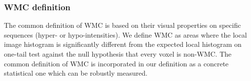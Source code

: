 \subsubsection{WMC definition}
The common definition of WMC is based on their visual properties on specific sequences (hyper- or hypo-intensities). We define WMC as areas where the local image histogram is significantly different from the expected local histogram on one-tail test against the null hypothesis that every voxel is non-WMC. The common definition of WMC is incorporated in our definition as a concrete statistical one which can be robustly measured.

    
    
    